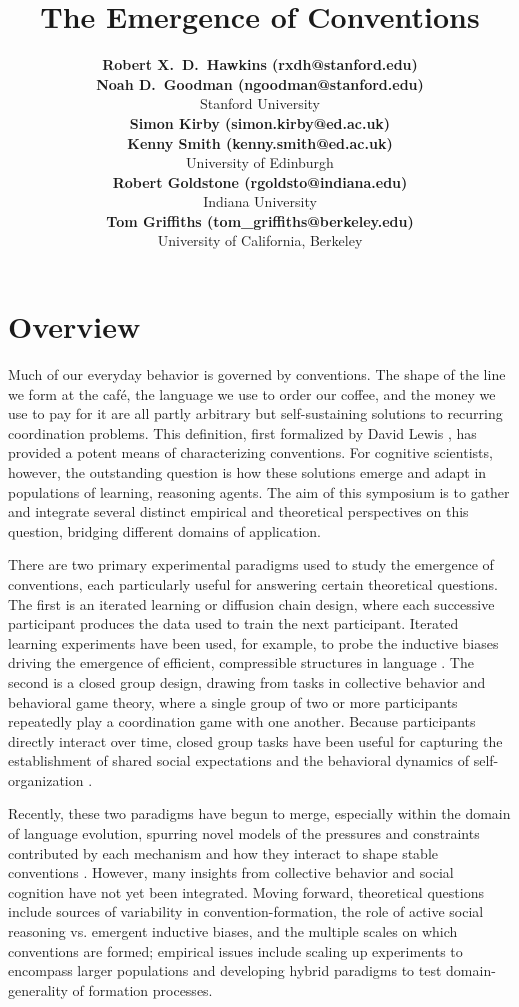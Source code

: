 \documentclass[10pt,letterpaper]{article}
\title{The Emergence of Conventions}
\author{
{\large \bf Robert X.~D.~Hawkins (rxdh@stanford.edu)} \\ 
{\large \bf Noah D.~Goodman (ngoodman@stanford.edu)}\\
  Stanford University \\
{\large \bf Simon Kirby (simon.kirby@ed.ac.uk)} \\
{\large \bf Kenny Smith (kenny.smith@ed.ac.uk)} \\
  University of Edinburgh \\
{\large \bf Robert Goldstone (rgoldsto@indiana.edu)}\\
  Indiana University\\  
{\large \bf Tom Griffiths (tom\_griffiths@berkeley.edu)}\\
University of California, Berkeley}
\begin{document}
\maketitle

\section{Overview}

Much of our everyday behavior is governed by conventions. The shape of the line we form at the caf\'e, the language we use to order our coffee, and the money we use to pay for it are all partly arbitrary but self-sustaining solutions to recurring coordination problems. This definition, first formalized by David Lewis \citeyear{Lewis69_Convention}, has provided a potent means of characterizing conventions. For cognitive scientists, however, the outstanding question is how these solutions emerge and adapt in populations of learning, reasoning agents. The aim of this symposium is to gather and integrate several distinct empirical and theoretical perspectives on this question, bridging different domains of application.

There are two primary experimental paradigms used to study the emergence of conventions, each particularly useful for answering certain theoretical questions. The first is an iterated learning or diffusion chain design, where each successive participant produces the data used to train the next participant. Iterated learning experiments have been used, for example, to probe the inductive biases driving the emergence of efficient, compressible structures in language \cite{KirbyCornishSmith08_PNAS, GriffithsKalish07_LanguageEvolution}. The second is a closed group design, drawing from tasks in collective behavior and behavioral game theory, where a single group of two or more participants repeatedly play a coordination game with one another. Because participants directly interact over time, closed group tasks have been useful for capturing the establishment of shared social expectations and the behavioral dynamics of self-organization \cite{ClarkWilkesGibbs86_ReferringCollaborative, GoldstoneRobertsGureckis08_EmergentProcesses, Galantucci05_EmergenceOfCommunication}.

Recently, these two paradigms have begun to merge, especially within the domain of language evolution, spurring novel models of the pressures and constraints contributed by each mechanism and how they interact to shape stable conventions \cite{KirbyTamarizCornishSmith15_CompressionCommunication, CentolaBaronchelli15_ConventionEmergence}. However, many insights from collective behavior and social cognition have not yet been integrated. Moving forward, theoretical questions include sources of variability in convention-formation, the role of active social reasoning vs. emergent inductive biases, and the multiple scales on which conventions are formed; empirical issues include scaling up experiments to encompass larger populations and developing hybrid paradigms to test domain-generality of formation processes. 
\end{document}
